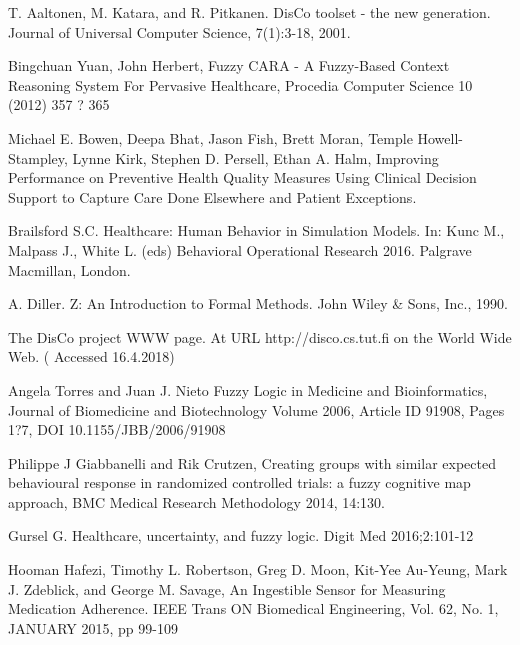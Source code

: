 \documentclass{llncs}
\begin{document}

\begin{thebibliography}{99}


 T. Aaltonen, M. Katara, and R. Pitkanen. DisCo toolset - the new generation. Journal of Universal Computer Science, 7(1):3-18, 2001.

 Bingchuan Yuan, John Herbert, Fuzzy CARA - A Fuzzy-Based Context Reasoning System For Pervasive Healthcare,  Procedia Computer Science 10 (2012) 357 ? 365

 Michael E. Bowen, Deepa Bhat, Jason Fish, Brett Moran, Temple Howell-Stampley, Lynne Kirk, Stephen D. Persell, Ethan A. Halm, Improving Performance on Preventive Health Quality Measures Using Clinical Decision Support to Capture Care Done Elsewhere and Patient Exceptions.

 Brailsford S.C. Healthcare: Human Behavior in Simulation Models. In: Kunc M., Malpass J., White L. (eds) Behavioral Operational Research 2016. Palgrave Macmillan, London.

  A. Diller. Z: An Introduction to Formal Methods. John Wiley \& Sons, Inc., 1990.

 The DisCo project WWW page. At URL http://disco.cs.tut.fi on the World Wide Web. ( Accessed 16.4.2018)

 Angela Torres and Juan J. Nieto Fuzzy Logic in Medicine and Bioinformatics, Journal of Biomedicine and Biotechnology Volume 2006, Article ID 91908, Pages 1?7, DOI 10.1155/JBB/2006/91908

 Philippe J Giabbanelli and Rik Crutzen, Creating groups with similar expected behavioural response in randomized controlled trials: a fuzzy cognitive map approach, BMC Medical Research Methodology 2014, 14:130.


 Gursel G. Healthcare, uncertainty, and fuzzy logic. Digit Med 2016;2:101-12

 Hooman Hafezi, Timothy L. Robertson, Greg D. Moon, Kit-Yee Au-Yeung, Mark J. Zdeblick, and George M. Savage, An Ingestible Sensor for Measuring Medication Adherence. IEEE Trans ON Biomedical Engineering, Vol. 62, No. 1, JANUARY 2015, pp 99-109


\end{thebibliography}
\end{document}
